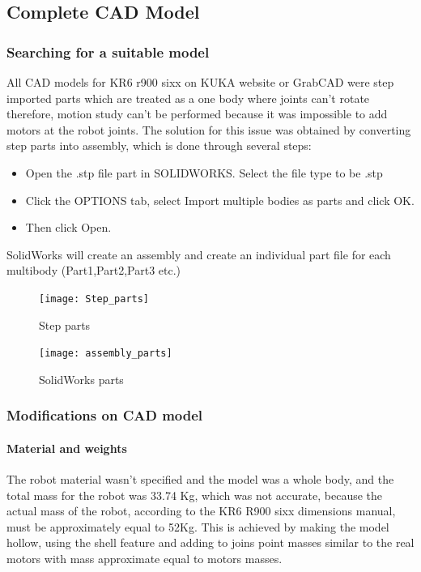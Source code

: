 \subsection{Complete CAD Model}

\subsubsection{Searching for a suitable model}
All CAD models for KR6 r900 sixx on KUKA website or GrabCAD were step imported parts which are treated as a one body where joints can’t rotate therefore, motion study can’t be performed because it was impossible to add motors at the robot joints. The solution for this issue was obtained by converting step parts into assembly, which is done through several steps:
\begin{itemize}
	\item Open the .stp file part in SOLIDWORKS.  Select the file type to be .stp
	\item Click the OPTIONS tab, select Import multiple bodies as parts and click OK.
	\item Then click Open.
\end{itemize}
SolidWorks will create an assembly and create an individual part file for each multibody (Part1,Part2,Part3 etc.)
\begin{figure}[H]
	\centering
	\texttt{[image: Step\_parts]}
	\caption{Step parts}
\end{figure}

\begin{figure}[H]
	\centering
	\texttt{[image: assembly\_parts]}
	\caption{SolidWorks parts}
\end{figure}

\subsubsection{Modifications on CAD model}
\paragraph{Material and weights}
The robot material wasn’t specified and the model was a whole body, and the total mass for the robot was 33.74 Kg, which was not accurate, because the actual mass of the robot, according to the KR6 R900 sixx dimensions manual, must be approximately equal to 52Kg. This is achieved by making the model hollow, using the shell feature and adding to joins point masses similar to the real motors with mass approximate equal to motors masses. 

